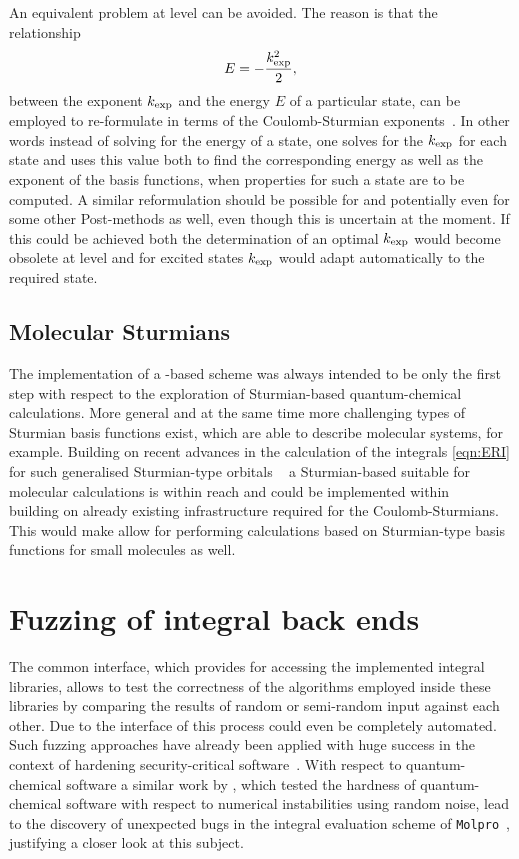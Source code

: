 \noindent
An equivalent problem at \FCI level can be avoided.
The reason is that the relationship
\[ E = - \frac{k_\text{exp}^2}{2}, \]
between the \CS exponent $k_\text{exp}$ and the energy $E$ of a particular state,
can be employed to re-formulate \FCI in terms of the
Coulomb-Sturmian exponents~\cite{Avery2006}.
In other words instead of solving for the energy of a state,
one solves for the $k_\text{exp}$ for each state
and uses this value both to find the corresponding energy
as well as the exponent of the basis functions,
when properties for such a state are to be computed.
A similar reformulation should be possible for \HF
and potentially even for some other Post-\HF methods as well,
even though this is uncertain at the moment.
If this could be achieved both the determination of an optimal
$k_\text{exp}$ would become obsolete at \HF level
and for excited states $k_\text{exp}$ would adapt automatically to the required state.

\subsection{Molecular Sturmians}
\label{sec:MolecularSturmian}
The implementation of a \CS-based \SCF scheme was always intended
to be only the first step with respect to the exploration
of Sturmian-based quantum-chemical calculations.
More general and at the same time more challenging types of Sturmian basis
functions exist,
which are able to describe molecular systems, for example.
Building on recent advances in the calculation of the \ERI integrals
\eqref{eqn:ERI} for such generalised Sturmian-type orbitals%
~\cite{Avery2006,Avery2011PhD,Avery2011,Morales2016,Avery2017,Randazzo2015,Granados2016}
a Sturmian-based \HF suitable for molecular calculations is within reach
and could be implemented within \sturmint~\cite{sturmintWeb}
building on already existing infrastructure required for the Coulomb-Sturmians.
This would make allow for performing calculations
based on Sturmian-type basis functions for small molecules as well.


%
%
\section{Fuzzing of integral back ends}
\label{sec:Fuzzing}
The common interface, which \molsturm provides
for accessing the implemented integral libraries,
allows to test the correctness
of the algorithms employed inside these libraries
by comparing the results of
random or semi-random input against each other.
Due to the \python interface of \molsturm this process could
even be completely automated.
Such fuzzing approaches have already been applied with huge success
in the context of hardening security-critical software~\cite{Fuzzing}.
With respect to quantum-chemical software
a similar work by \citet{Knizia2011},
which tested the hardness of quantum-chemical software
with respect to numerical instabilities using random noise,
lead to the discovery of unexpected bugs
in the integral evaluation scheme of \texttt{Molpro}~\cite{Molpro},
justifying a closer look at this subject.

